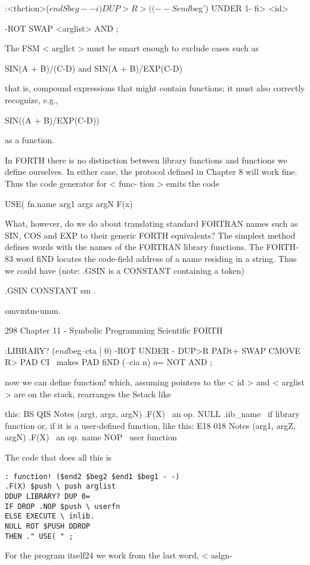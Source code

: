 :<thction>($endSbeg--i)
DUP>R >( (--Send$beg')
UNDER 1- fi> <id>

-ROT SWAP <arglist> AND ;

The FSM < argllct > must be smart enough to exclude cases such
as

SIN(A + B)/(C-D)
and
SIN(A + B)/EXP(C-D)

that is, compound expressions that might contain functions; it
must also correctly recognize, e.g.,

SIN((A + B)/EXP(C-D))

as a function.

In FORTH there is no distinction between library functions and
functions we define ourselves. In either case, the protocol defined
in Chapter 8 will work fine. Thus the code generator for < func-
tion > emits the code

USE( fn.name arg1 argz argN F(x)

What, however, do we do about translating standard FORTRAN
names such as SIN, COS and EXP to their generic FORTH
equivalents? The simplest method defines words with the names
of the FORTRAN library functions. The FORTH-83 word fiND
locates the code-field address of a name residing in a string. Thus
we could have (note: .GSIN is a CONSTANT containing a token)

.GSIN CONSTANT sm \etc.

omvmtm-umm.

298 Chapter 11 - Symbolic Programming Scientific FORTH

:LIBRARY? ($end$beg--cta | 0)
-ROT UNDER - DUP>R
PADt+ SWAP CMOVE R> PAD CI \ makes
PAD fiND (--cia n) o= NOT AND ;

now we can define function! which, assuming pointers to the
< id > and < arglist > are on the stack, rearranges the Sstack like

this:
BS QIS Notes
(argt, argz, argN) .F(X) \ an op.
NULL .iib\_name \ if library function
or, if it is a user-defined function, like this:
E18 018 Notes
(arg1, argZ, argN) .F(X) \ an op.
name NOP \ user function

The code that does all this is

\begin{lstlisting}
: function! ($end2 $beg2 $end1 $beg1 - -)
.F(X) $push \ push arglist
DDUP LIBRARY? DUP 0=
IF DROP .NOP $push \ userfn
ELSE EXECUTE \ inlib.
NULL ROT $PUSH DDROP
THEN ." USE( " ;
\end{lstlisting}

For the program itself24 we work from the last word, < aslgn-

